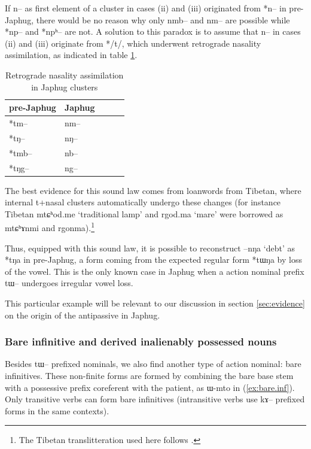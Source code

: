 \documentclass[oldfontcommands,oneside,a4paper,11pt]{article}
\newcommand{\ipa}[1]{{\phon \mbox{#1}}} %
\begin{document}
If \ipa{n}-- as first element of a cluster in cases (ii) and (iii) originated from *n-- in pre-Japhug, there would be no reason why only \ipa{nmb--} and \ipa{nm--} are possible while *\ipa{np--} and *\ipa{npʰ--} are not. A solution to this paradox is to assume that \ipa{n--} in cases (ii) and (iii) originate from */t/, which underwent retrograde nasality assimilation, as indicated in table \ref{tab:assimilation}.

\begin{table}[H]
\caption{Retrograde nasality assimilation in Japhug clusters} \label{tab:assimilation} \centering
\begin{tabular}{lllll}
\toprule
pre-Japhug & Japhug \\
\midrule
\ipa{*tm}-- & \ipa{nm--} \\
\ipa{*tŋ}-- & \ipa{nŋ--} \\
\ipa{*tmb}-- & \ipa{nb--} \\
\ipa{*tŋg}-- & \ipa{ng--} \\
\bottomrule
\end{tabular}
\end{table}
The best evidence for  this sound law comes from loanwords from Tibetan, where internal t+nasal clusters automatically undergo these changes (for instance Tibetan \ipa{mtɕʰod.me} `traditional lamp' and \ipa{rgod.ma} `mare' were borrowed as \ipa{mtɕʰɤnmi} and \ipa{rgonma}).\footnote{The Tibetan translitteration used here follows \citet{jacques12transcription}. }

Thus, equipped with this sound law,  it is possible to reconstruct \ipa{--nŋa} `debt' as *\ipa{tŋa} in pre-Japhug, a form coming from the expected regular form *\ipa{tɯŋa} by loss of the vowel. This is the only known case in Japhug when a action nominal prefix \ipa{tɯ}-- undergoes irregular vowel loss.




This particular example will be relevant to our discussion in section \ref{sec:evidence} on the origin of the antipassive in Japhug.

\subsubsection{Bare infinitive  and derived inalienably possessed nouns} \label{subsubsec:bare}
Besides \ipa{tɯ}-- prefixed nominals, we also find another type of action nominal:   bare  infinitives. These non-finite forms are formed by combining the bare base stem with a possessive prefix coreferent with the patient, as \ipa{ɯ-mto} in (\ref{ex:bare.inf}). Only transitive verbs can form bare infinitives (intransitive verbs use \ipa{kɤ}-- prefixed forms in the same contexts).
\end{document}
